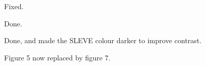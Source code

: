\documentclass{article}
\begin{document}
\begin{quotation}
\begin{comment}
\item Line 466: `\ldots Cartesian \ldots'
\end{comment}
\end{quotation}
Fixed.

\begin{quotation}
\begin{comment}
\item Table 1: instead of showing these strange numbers like 13.6, -623 and 3480 it would be helpful to say `unstable'.
\end{comment}
\end{quotation}
Done.

\begin{quotation}
\begin{comment}
\item Figure 3: Replot this figure.  The lines need to be thicker, e.g. the SLEVE line is almost invisible.
\end{comment}
\end{quotation}
Done, and made the SLEVE colour darker to improve contrast.

\begin{quotation}
\begin{comment}
\item Figure 5: The BTF $\theta$ line needs to be thicker.
\end{comment}
\end{quotation}
Figure 5 now replaced by figure 7.



\end{document}
